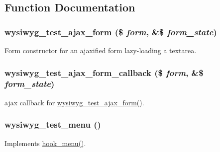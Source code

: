 \subsection{Function Documentation}
\hypertarget{wysiwyg__test_8module_aa2131e198f204a574c98392f334f416b}{
\subsubsection[{wysiwyg\_\-test\_\-ajax\_\-form}]{\setlength{\rightskip}{0pt plus 5cm}wysiwyg\_\-test\_\-ajax\_\-form (\$ {\em form}, \/  \&\$ {\em form\_\-state})}}
\label{wysiwyg__test_8module_aa2131e198f204a574c98392f334f416b}
Form constructor for an ajaxified form lazy-\/loading a textarea. \hypertarget{wysiwyg__test_8module_ab98623d1723f5f650fcab9955657746f}{
\subsubsection[{wysiwyg\_\-test\_\-ajax\_\-form\_\-callback}]{\setlength{\rightskip}{0pt plus 5cm}wysiwyg\_\-test\_\-ajax\_\-form\_\-callback (\$ {\em form}, \/  \&\$ {\em form\_\-state})}}
\label{wysiwyg__test_8module_ab98623d1723f5f650fcab9955657746f}
ajax callback for \hyperlink{wysiwyg__test_8module_aa2131e198f204a574c98392f334f416b}{wysiwyg\_\-test\_\-ajax\_\-form()}. \hypertarget{wysiwyg__test_8module_a0f529be1b315b2b49df1e3ec4935a152}{
\subsubsection[{wysiwyg\_\-test\_\-menu}]{\setlength{\rightskip}{0pt plus 5cm}wysiwyg\_\-test\_\-menu ()}}
\label{wysiwyg__test_8module_a0f529be1b315b2b49df1e3ec4935a152}
Implements \hyperlink{group__hooks_ga5c95244fea59b25666e409759e133ded}{hook\_\-menu()}. 